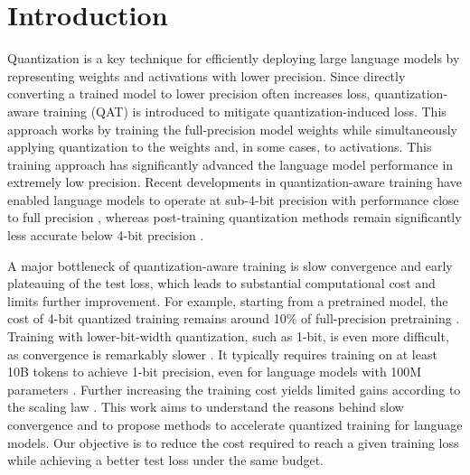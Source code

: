 \documentclass{article}
\theoremstyle{definition}
\begin{document}
\section{Introduction}

Quantization is a key technique for efficiently deploying large language models by representing weights and activations with lower precision. Since directly converting a trained model to lower precision often increases loss, quantization-aware training (QAT) \citep{jacob2018quantization} is introduced to mitigate quantization-induced loss. This approach works by training the full-precision model weights while simultaneously applying quantization to the weights and, in some cases, to activations. This training approach has significantly advanced the language model performance in extremely low precision. Recent developments in quantization-aware training have enabled language models to operate at sub-4-bit precision with performance close to full precision \citep{gholami2022survey}, whereas post-training quantization methods remain significantly less accurate below 4-bit precision \citep{ashkboos2024quarot}.

A major bottleneck of quantization-aware training is slow convergence and early plateauing of the test loss, which leads to substantial computational cost and limits further improvement. For example, starting from a pretrained model, the cost of 4-bit quantized training remains around 10\% of full-precision pretraining \citep{liu2025paretoq}. Training with lower-bit-width quantization, such as 1-bit, is even more difficult, as convergence is remarkably slower \citep{wang2023bitnet}. It typically requires training on at least 10B tokens to achieve 1-bit precision, even for language models with 100M parameters \citep{panferov2025quest}. Further increasing the training cost yields limited gains according to the scaling law \citep{kumarscaling}. This work aims to understand the reasons behind slow convergence and to propose methods to accelerate quantized training for language models. Our objective is to reduce the cost required to reach a given training loss while achieving a better test loss under the same budget.
\end{document}
